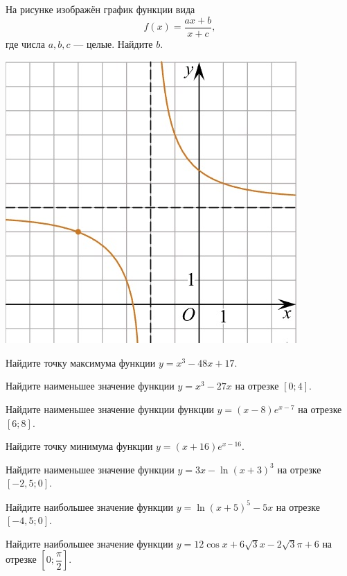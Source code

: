 \begin{consultation}
\begin{listofex}
\begin{minipage}[t]{\picwidth}
		\end{minipage}
		\item
		\begin{minipage}[t]{\bodywidth}
			На рисунке изображён график функции вида \[ f(x)=\dfrac{ax+b}{x+c}, \] где числа \(a, b, c\) --- целые. Найдите \(b\).
		\end{minipage}
		\hspace{0.02\linewidth}
		\begin{minipage}[t]{\picwidth}
			\includegraphics[align=t, width=\linewidth]{../pics/G101M4C6-5.jpg}
		\end{minipage}
		\item Найдите точку максимума функции \( y=x^3-48x+17 \).
		\item Найдите наименьшее значение функции \( y=x^3-27x \) на отрезке \( [0;4] \).
		\item Найдите наименьшее значение функции функции \( y=(x-8)e^{x-7} \) на отрезке \( [6;8] \).
		\item Найдите точку минимума функции \( y=(x+16)e^{x-16} \).
		\item Найдите наименьшее значение функции \( y=3x-\ln(x+3)^3 \) на отрезке \( [-2,5;0] \).
		\item Найдите наибольшее значение функции \( y=\ln (x+5)^5-5x \) на отрезке \( [-4,5;0] \).
		\item Найдите наибольшее значение функции \( y=12\cos x +6 \sqrt{3}x - 2 \sqrt{3} \pi +6 \) на отрезке \( \left[ 0; \dfrac{ \pi }{ 2 } \right]  \).

\end{listofex}
\end{consultation}
